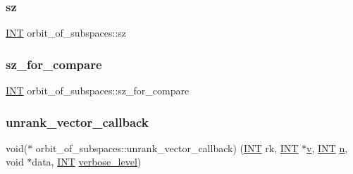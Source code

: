 \mbox{\label{classorbit__of__subspaces_ab733c7086457fc40f74a08f4e8a0ab6e}} 
\subsubsection{\texorpdfstring{sz}{sz}}
{\footnotesize\ttfamily \mbox{\hyperlink{galois_8h_a09fddde158a3a20bd2dcadb609de11dc}{I\+NT}} orbit\+\_\+of\+\_\+subspaces\+::sz}

\mbox{\label{classorbit__of__subspaces_af65128b411ed794d71d19153bb89f88d}} 
\subsubsection{\texorpdfstring{sz\+\_\+for\+\_\+compare}{sz\_for\_compare}}
{\footnotesize\ttfamily \mbox{\hyperlink{galois_8h_a09fddde158a3a20bd2dcadb609de11dc}{I\+NT}} orbit\+\_\+of\+\_\+subspaces\+::sz\+\_\+for\+\_\+compare}

\mbox{\label{classorbit__of__subspaces_aae2846b7a00d83ecd3c7d176dc2a055a}} 
\subsubsection{\texorpdfstring{unrank\+\_\+vector\+\_\+callback}{unrank\_vector\_callback}}
{\footnotesize\ttfamily void($\ast$ orbit\+\_\+of\+\_\+subspaces\+::unrank\+\_\+vector\+\_\+callback) (\mbox{\hyperlink{galois_8h_a09fddde158a3a20bd2dcadb609de11dc}{I\+NT}} rk, \mbox{\hyperlink{galois_8h_a09fddde158a3a20bd2dcadb609de11dc}{I\+NT}} $\ast$\mbox{\hyperlink{simeon_8_c_aeb3f3030944801b163bc3b829a7f6710}{v}}, \mbox{\hyperlink{galois_8h_a09fddde158a3a20bd2dcadb609de11dc}{I\+NT}} \mbox{\hyperlink{classorbit__of__subspaces_a86783a798a9d837bfa689eef4e6554f5}{n}}, void $\ast$data, \mbox{\hyperlink{galois_8h_a09fddde158a3a20bd2dcadb609de11dc}{I\+NT}} \mbox{\hyperlink{simeon_8_c_a818073fbcc2f439e7c56952f67386122}{verbose\+\_\+level}})}

